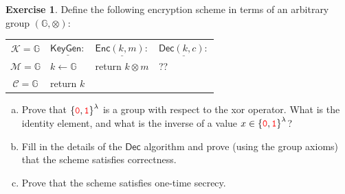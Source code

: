 \documentclass[12pt,openany]{book}
\theoremstyle{definition}
\newtheorem{exercise}{Exercise}[chapter]
\newcommand{\G}{\mathbb{G}}
\newcommand{\KeyGen}{\mathsf{KeyGen}}
\newcommand{\Enc}{\mathsf{Enc}}
\newcommand{\Dec}{\mathsf{Dec}}
\newcommand{\keyspace}{\mathcal{K}}
\newcommand{\messagespace}{\mathcal{M}}
\newcommand{\ciphertextspace}{\mathcal{C}}
\newcommand{\zero}{\textcolor{red}{\texttt{0}}}
\newcommand{\one}{\textcolor{red}{\texttt{1}}}
\newcommand{\tab}{\hspace{12pt}}
\newcommand{\binaryfield}{\set{\zero,\one}}
\begin{document}
\begin{tcolorbox}[colback=white,colframe=execolor,arc=5pt,title={\color{white}\bf }]
\begin{exercise}
			Define the following encryption scheme in terms of an arbitrary group \((\G, \otimes)\):
			\begin{center}
				\begin{tabular}{|clll|}
					\hline
					\(\keyspace=\G\) & \(\underline{\KeyGen:}\) & \(\underline{\Enc(k,m):}\) &\(\underline{\Dec(k,c):}\) \\
					\(\messagespace=\G\) & \tab\(k\gets\G\) & \tab return \(k\otimes m\) & \tab ??\\
					\(\ciphertextspace=\G\) & \tab return \(k\) &&\\
					\hline
				\end{tabular}
			\end{center}
			\begin{enumerate}[(a)]
				\item Prove that \(\binaryfield^\lambda\) is a group with respect to the xor operator. What is the identity
				element, and what is the inverse of a value $x\in\binaryfield^\lambda$?
				\item Fill in the details of the $\Dec$ algorithm and prove (using the group axioms) that the scheme satisfies correctness.
				\item Prove that the scheme satisfies one-time secrecy.
			\end{enumerate}
		\end{exercise}
	\end{tcolorbox}
	\iffalse
\end{document}
